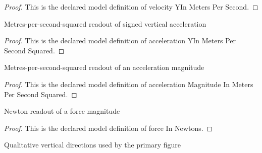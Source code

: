 \begin{proof}
  This is the declared model definition of velocity YIn Meters Per Second.
\end{proof}
\begin{definition}
  \label{def:physics:phyx-mini-0802:phyxminiproblems-problemphyxmini0802-accelerationyinmeterspersecondsquared}
  Metres-per-second-squared readout of signed vertical acceleration
\end{definition}
\begin{proof}
  This is the declared model definition of acceleration YIn Meters Per Second Squared.
\end{proof}
\begin{definition}
  \label{def:physics:phyx-mini-0802:phyxminiproblems-problemphyxmini0802-accelerationmagnitudeinmeterspersecondsquared}
  Metres-per-second-squared readout of an acceleration magnitude
\end{definition}
\begin{proof}
  This is the declared model definition of acceleration Magnitude In Meters Per Second Squared.
\end{proof}
\begin{definition}
  \label{def:physics:phyx-mini-0802:phyxminiproblems-problemphyxmini0802-forceinnewtons}
  Newton readout of a force magnitude
\end{definition}
\begin{proof}
  This is the declared model definition of force In Newtons.
\end{proof}
\begin{definition}
  \label{def:physics:phyx-mini-0802:phyxminiproblems-problemphyxmini0802-verticaldirection}
  Qualitative vertical directions used by the primary figure
\end{definition}
